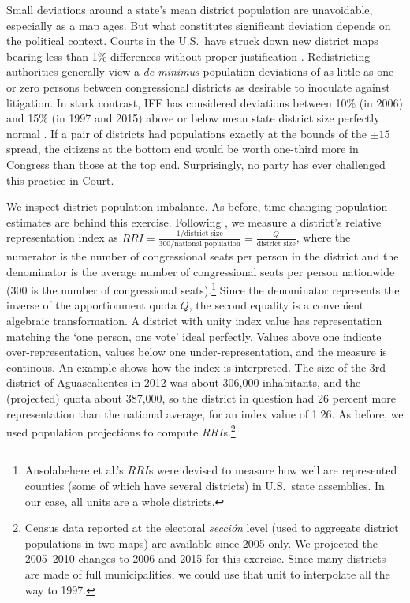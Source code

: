 \documentclass[letter,12pt]{article}
\begin{document}
Small deviations around a state's mean district population are unavoidable, especially as a map ages. But what constitutes significant deviation depends on the political context. Courts in the U.S.\ have struck down new district maps bearing less than 1\% differences without proper justification \citep{tuckerApportionment.1985}. Redistricting authorities generally view a \emph{de minimus} population deviations of as little as one or zero persons between congressional districts as desirable to inoculate against litigation. In stark contrast, IFE has considered deviations between 10\% (in 2006) and 15\% (in 1997 and 2015) above or below mean state district size perfectly normal \citep{lujambio.vives.2008,trelles.mtz.polygob2012}. If a pair of districts had populations exactly at the bounds of the $\pm15$ spread, the citizens at the bottom end would be worth one-third more in Congress than those at the top end. Surprisingly, no party has ever challenged this practice in Court. 

We inspect district population imbalance. As before, time-changing population estimates are behind this exercise. Following \citet{ansolabehere.gerber.snyderCourtRedis2002}, we measure a district's relative representation index as $RRI = \frac{1/\text{district size}}{300/\text{national population}} = \frac{Q}{\text{district size}}$, where the numerator is the number of congressional seats per person in the district and the denominator is the average number of congressional seats per person nationwide (300 is the number of congressional seats).\footnote{Ansolabehere et al.'s $RRI$s were devised to measure how well are represented counties (some of which have several districts) in U.S.\ state assemblies. In our case, all units are a whole districts.} Since the denominator represents the inverse of the apportionment quota $Q$, the second equality is a convenient algebraic transformation. A district with unity index value has representation matching the `one person, one vote' ideal perfectly. Values above one indicate over-representation, values below one under-representation, and the measure is continous. An example shows how the index is interpreted. The size of the 3rd district of Aguascalientes in 2012 was about 306,000 inhabitants, and the (projected) quota about 387,000, so the district in question had 26 percent more representation than the national average, for an index value of 1.26. As before, we used population projections to compute $RRI$s.\footnote{Census data reported at the electoral \emph{secci\'on} level (used to aggregate district populations in two maps) are available since 2005 only. We projected the 2005--2010 changes to 2006 and 2015 for this exercise. Since many districts are made of full municipalities, we could use that unit to interpolate all the way to 1997.} 
\end{document}
